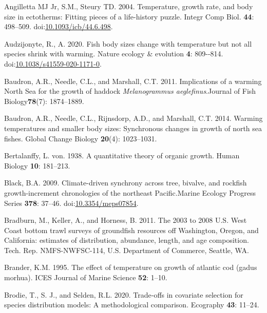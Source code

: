\documentclass[
]{article}
\newlength{\cslhangindent}
\newlength{\cslentryspacingunit} %
\newenvironment{CSLReferences}[2] %
 {%
  \setlength{\parindent}{0pt}
  \ifodd #1
  \let\oldpar\par
  \def\par{\hangindent=\cslhangindent\oldpar}
  \fi
  \setlength{\parskip}{#2\cslentryspacingunit}
 }%
 {}
\newcommand{\jfb}{Journal of Fish Biology\xspace}
\newcommand{\meps}{Marine Ecology Progress Series\xspace}
\begin{document}
\hypertarget{refs}{}
\begin{CSLReferences}{1}{0}
\leavevmode{}%
Angilletta MJ Jr, S.M., Steury TD. 2004. Temperature, growth rate, and
body size in ectotherms: Fitting pieces of a life-history puzzle. Integr
Comp Biol. \textbf{44}: 498--509.
doi:\href{https://doi.org/10.1093/icb/44.6.498}{10.1093/icb/44.6.498}.

\leavevmode{}%
Audzijonyte, R., A. 2020. Fish body sizes change with temperature but
not all species shrink with warming. Nature ecology \& evolution
\textbf{4}: 809-\/-814.
doi:\href{https://doi.org/10.1038/s41559-020-1171-0}{10.1038/s41559-020-1171-0}.

\leavevmode{}%
Baudron, A.R., Needle, C.L., and Marshall, C.T. 2011. Implications of a
warming {N}orth {S}ea for the growth of haddock \emph{{M}elanogrammus
aeglefinus}.\jfb \textbf{78}(7): 1874--1889.

\leavevmode{}%
Baudron, A.R., Needle, C.L., Rijnsdorp, A.D., and Marshall, C.T. 2014.
Warming temperatures and smaller body sizes: Synchronous changes in
growth of north sea fishes. Global Change Biology \textbf{20}(4):
1023--1031.

\leavevmode{}%
Bertalanffy, L. von. 1938. A quantitative theory of organic growth.
Human Biology \textbf{10}: 181--213.

\leavevmode{}%
Black, B.A. 2009. {Climate-driven synchrony across tree, bivalve, and
rockfish growth-increment chronologies of the northeast Pacific}.\meps
\textbf{378}: 37--46.
doi:\href{https://doi.org/10.3354/meps07854}{10.3354/meps07854}.

\leavevmode{}%
Bradburn, M., Keller, A., and Horness, B. 2011. {The 2003 to 2008 U.S.
West Coast bottom trawl surveys of groundfish resources off Washington,
Oregon, and California: estimates of distribution, abundance, length,
and age composition}. {Tech. Rep. NMFS-NWFSC-114, U.S. Department of
Commerce, Seattle, WA}.

\leavevmode{}%
Brander, K.M. 1995. The effect of temperature on growth of atlantic cod
(gadus morhua). ICES Journal of Marine Science \textbf{52}: 1--10.

\leavevmode{}%
Brodie, T., S. J., and Selden, R.L. 2020. Trade‐offs in covariate
selection for species distribution models: A methodological comparison.
Ecography \textbf{43}: 11--24.


\end{CSLReferences}
\end{document}
